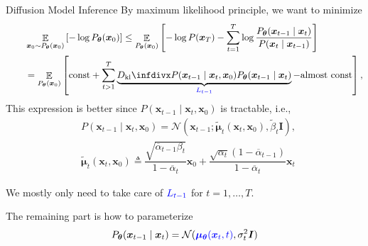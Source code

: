 \documentclass[10pt,xcolor={usenames,dvipsnames,table},aspectratio=169]{beamer}
\begin{document}
\begin{frame}{Diffusion Model Inference}
    By maximum likelihood principle, we want to minimize
    \begin{align*}
    &\mathop{\mathbb{E}}_{\bm{x}_0 \sim P_{\boldsymbol \theta}(\bm{x}_0)} \left[ -\log P_{\boldsymbol \theta}(\bm{x}_0) \right] 
    \leq  
    \mathop{\mathbb{E}}_{P_{\boldsymbol \theta}(\bm{x}_0)} \left[ -\log P(\bm{x}_T) - \sum^{T}_{t=1} \log \dfrac{P_{\boldsymbol \theta}(\bm{x}_{t-1} \mid \bm{x}_t)}{P(\bm{x}_t \mid \bm{x}_{t-1})}\right] \\
    \quad \quad &= \mathop{\mathbb{E}}_{P_{\boldsymbol \theta}(\bm{x}_0)} \left[ \text{const} + \sum^{T}_{t>1} \underbrace{\Dkl{P(\bm{x}_{t-1} \mid \bm{x}_t, \bm{x}_0)}{P_{\boldsymbol \theta}(\bm{x}_{t-1} \mid \bm{x}_t)}}_{\blue L_{t-1}} - \text{almost const} \right],
    \end{align*} 
    This expression is better since $P(\bm{x}_{t-1} \mid \bm{x}_t, \bm{x}_0)$ is tractable, i.e.,
    \begin{align*}
    &P(\bm{x}_{t-1} \mid \bm{x}_t, \bm{x}_0) = \mathcal{N}(\bm{x}_{t-1}; \widetilde{\boldsymbol \mu}_t(\bm{x}_t, \bm{x}_0), \widetilde{\beta}_t \bm{I}), \\
    &\widetilde{\boldsymbol \mu}_t(\bm{x}_t, \bm{x}_0) \triangleq 
    \dfrac{\sqrt{\overline{\alpha}_{t-1} \beta_t}}{1- \overline{\alpha}_t} \bm{x}_0 + \dfrac{\sqrt{\alpha_t}(1- \overline{\alpha}_{t-1})}{1- \overline{\alpha}_t} \bm{x}_t
    \end{align*}

    We mostly only need to take care of ${\color{blue} L_{t-1}}$ for $t=1, \ldots , T$. 

   The remaining part is how to parameterize 
    \[
    P_{\boldsymbol \theta}(\bm{x}_{t-1} \mid \bm{x}_t) = \mathcal{N}({\color{blue} \boldsymbol \mu_{\boldsymbol \theta}(\bm{x}_t, t)}, \sigma_t^2 \bm{I})
    \] 
\end{frame}
\end{document}
